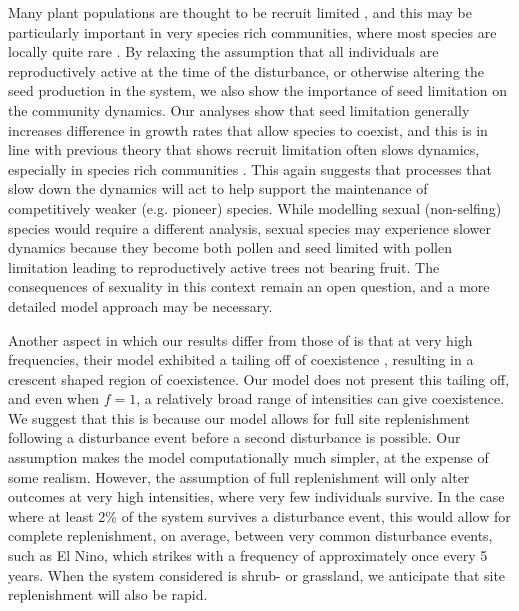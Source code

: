 Many plant populations are thought to be recruit limited \citep[e.g.][]{clark1998stages,eriksson1992seed,svenning2005seed}, and this may be particularly important in very species rich communities, where most species are locally quite rare \citep[e.g.][]{svenning2005seed}. By relaxing the assumption that all individuals are reproductively active at the time of the disturbance, or otherwise altering the seed production in the system, we also show the importance of seed limitation on the community dynamics. Our analyses show that seed limitation generally increases difference in growth rates that allow species to coexist, and this is in line with previous theory that shows recruit limitation often slows dynamics, especially in species rich communities \citep{hurtt1995consequences}. This again suggests that processes that slow down the dynamics will act to help support the maintenance of competitively weaker (e.g. pioneer) species. While modelling sexual (non-selfing) species would require a different analysis, sexual species may experience slower dynamics because they become both pollen and seed limited with pollen limitation leading to reproductively active trees not bearing fruit. The consequences of sexuality in this context remain an open question, and a more detailed model approach may be necessary.

Another aspect in which our results differ from those of  \cite{miller2011frequency} is that at very high frequencies, their model exhibited a tailing off of coexistence \citep[Figure 1 of ][]{miller2011frequency}, resulting in a crescent shaped region of coexistence. Our model does not  present this tailing off, and even when $f=1$, a relatively broad range of intensities can give coexistence. We suggest that this is because our model allows for full site replenishment following a disturbance event before a second disturbance is possible. Our assumption makes the model computationally much simpler, at the expense of some realism. However, the assumption of full replenishment will only alter outcomes at very high intensities, where very few individuals survive. In the case where at least 2\% of the system survives a disturbance event, this would allow for complete replenishment, on average, between very common disturbance events, such as El Nino, which strikes with a frequency of approximately once every 5 years. When the system considered is shrub- or grassland, we anticipate that site replenishment will also be rapid.

